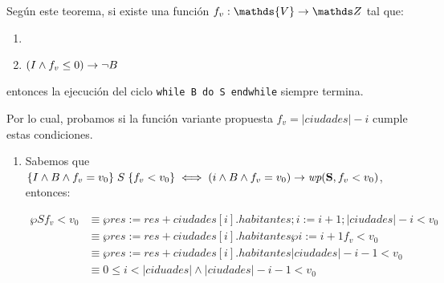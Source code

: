 \documentclass[10pt,a4paper]{article}
\begin{document}
Según este teorema, si existe una función $f_v: \mathds{V} \to \ent$ tal que:

\begin{enumerate}
	\item {}
	\item $(I \land f_v \leq 0) \rightarrow \neg B$
\end{enumerate}

entonces la ejecución del ciclo \lstinline|while B do S endwhile| siempre termina.
\bigskip

Por lo cual, probamos si la función variante propuesta $f_v = |ciudades| - i$ cumple estas condiciones.
\bigskip

\begin{enumerate}
	\item {}

	      Sabemos que $\hoare{I \land B \land f_v = v_0}{S}{f_v < v_0} \iff (i \land B \land f_v = v_0) \Then \wp{S}{f_v < v_0}$, entonces:

	      \begin{align*}
		      \wp{S}{f_v < v_0} & \equiv \wp{res := res + ciudades[i].habitantes; i := i + 1;}{|ciudades| - i < v_0} \\
		                        & \equiv \wp{res := res + ciudades[i].habitantes}{\wp{i := i + 1}{f_v < v_0}}        \\
		                        & \equiv \wp{res := res + ciudades[i].habitantes}{|ciudades| - i - 1 < v_0}          \\
		                        & \equiv 0 \leq i < |ciduades| \land |ciudades| - i - 1 < v_0
	      \end{align*}


\end{enumerate}
\end{document}
